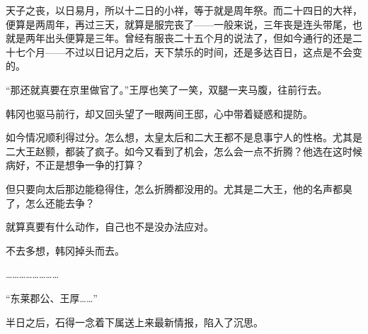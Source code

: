 天子之丧，以日易月，所以十二日的小祥，等于就是周年祭。而二十四日的大祥，便算是两周年，再过三天，就算是服完丧了——一般来说，三年丧是连头带尾，也就是两年出头便算是三年。曾经有服丧二十五个月的说法了，但如今通行的还是二十七个月——不过以日记月之后，天下禁乐的时间，还是多达百日，这点是不会变的。

“那还就真要在京里做官了。”王厚也笑了一笑，双腿一夹马腹，往前行去。

韩冈也驱马前行，却又回头望了一眼两间王邸，心中带着疑惑和提防。

如今情况顺利得过分。怎么想，太皇太后和二大王都不是息事宁人的性格。尤其是二大王赵颢，都装了疯子。如今又看到了机会，怎么会一点不折腾？他选在这时候病好，不正是想争一争的打算？

但只要向太后那边能稳得住，怎么折腾都没用的。尤其是二大王，他的名声都臭了，怎么还能去争？

就算真要有什么动作，自己也不是没办法应对。

不去多想，韩冈掉头而去。

……………………

“东莱郡公、王厚……”

半日之后，石得一念着下属送上来最新情报，陷入了沉思。

